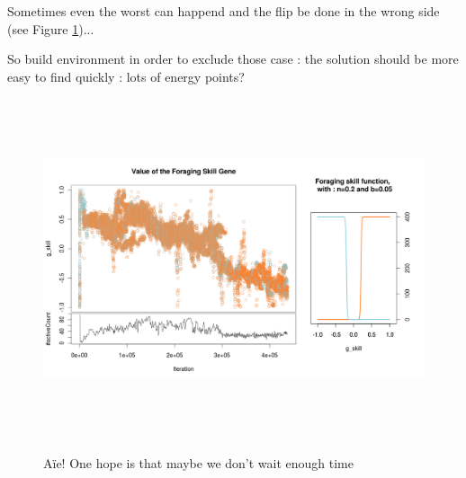 \documentclass[a4paper,10pt]{article}
\begin{document}
Sometimes even the worst can happend and the flip be done in the wrong side (see Figure \ref{fig:wrongflip})... 

So build environment in order to exclude those case : the solution should be more easy to find quickly : lots of energy points?

\begin{figure}
\caption{Aïe! One hope is that maybe we don't wait enough time} 

\begin{center}

\label{fig:wrongflip}
\includegraphics[height=10cm]{tanh_wrongflip}
\end{center}

\end{figure}
\end{document}
